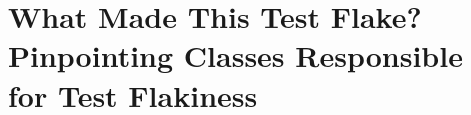 \chapter{What Made This Test Flake? Pinpointing Classes Responsible for Test Flakiness}
\label{chap:sherloc}

\chapterPage{
}









